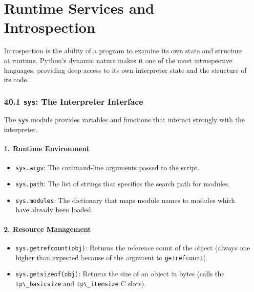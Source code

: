 \hypertarget{runtime-services-and-introspection}{%
\chapter{Runtime Services and
Introspection}\label{runtime-services-and-introspection}}

Introspection is the ability of a program to examine its own state and
structure at runtime. Python's dynamic nature makes it one of the most
introspective languages, providing deep access to its own interpreter
state and the structure of its code.

\hypertarget{sys-the-interpreter-interface}{%
\subsection{\texorpdfstring{40.1 \texttt{sys}: The Interpreter
Interface}{40.1 sys: The Interpreter Interface}}\label{sys-the-interpreter-interface}}

The \passthrough{\lstinline!sys!} module provides variables and
functions that interact strongly with the interpreter.

\hypertarget{runtime-environment}{%
\subsubsection{1. Runtime Environment}\label{runtime-environment}}

\begin{itemize}
\tightlist
\item
  \passthrough{\lstinline!sys.argv!}: The command-line arguments passed
  to the script.
\item
  \passthrough{\lstinline!sys.path!}: The list of strings that specifies
  the search path for modules.
\item
  \passthrough{\lstinline!sys.modules!}: The dictionary that maps module
  names to modules which have already been loaded.
\end{itemize}

\hypertarget{resource-management}{%
\subsubsection{2. Resource Management}\label{resource-management}}

\begin{itemize}
\tightlist
\item
  \passthrough{\lstinline!sys.getrefcount(obj)!}: Returns the reference
  count of the object (always one higher than expected because of the
  argument to \passthrough{\lstinline!getrefcount!}).
\item
  \passthrough{\lstinline!sys.getsizeof(obj)!}: Returns the size of an
  object in bytes (calls the \passthrough{\lstinline!tp\_basicsize!} and
  \passthrough{\lstinline!tp\_itemsize!} C slots).
\end{itemize}

